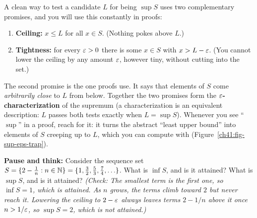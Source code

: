 \begin{focusbox}
A clean way to test a candidate $L$ for being $\sup S$ uses two complementary promises,
and you will use this constantly in proofs:
\begin{enumerate}
  \item \textbf{Ceiling:} $x \le L$ for all $x\in S$. (Nothing pokes above $L$.)
  \item \textbf{Tightness:} for every $\varepsilon>0$ there is some $x\in S$ with $x > L-\varepsilon$.
        (You cannot lower the ceiling by any amount $\varepsilon$, however tiny, without
        cutting into the set.)
\end{enumerate}
The second promise is the one proofs use. It says that elements of $S$ come
\emph{arbitrarily close} to $L$ from below. Together the two promises form the
\textbf{$\varepsilon$-characterization} of the supremum (a characterization is an equivalent
description: $L$ passes both tests exactly when $L=\sup S$). Whenever you see ``$\sup$'' in a
proof, reach for it: it turns the abstract ``least upper bound'' into elements of $S$
creeping up to $L$, which you can compute with (Figure~\ref{ch41:fig-sup-eps-trap}).
\end{focusbox}

\begin{recoverybox}
\textbf{Pause and think:} Consider the sequence set $S = \{2 - \frac{1}{n} : n \in \mathbb{N}\} = \{1, \frac{3}{2}, \frac{5}{3}, \frac{7}{4}, \ldots\}$.
What is $\inf S$, and is it attained? What is $\sup S$, and is it attained?
\emph{(Check: The smallest term is the first one, so $\inf S = 1$, which is attained. As $n$ grows, the terms climb toward $2$ but never reach it. Lowering the ceiling to $2 - \varepsilon$ always leaves terms $2 - 1/n$ above it once $n > 1/\varepsilon$, so $\sup S = 2$, which is not attained.)}
\end{recoverybox}


